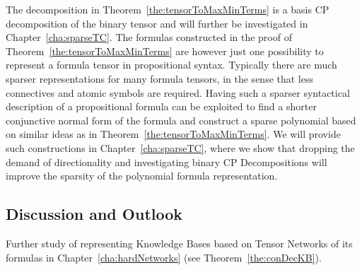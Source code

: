\begin{remark}
	The decomposition in Theorem~\ref{the:tensorToMaxMinTerms} is a basis CP decomposition of the binary tensor and will further be investigated in Chapter~\ref{cha:sparseTC}. 
	The formulas constructed in the proof of Theorem~\ref{the:tensorToMaxMinTerms} are however just one possibility to represent a formula tensor in propositional syntax.
	Typically there are much sparser representations for many formula tensors, in the sense that less connectives and atomic symbols are required.
	Having such a sparser syntactical description of a propositional formula can be exploited to find a shorter conjunctive normal form of the formula and construct a sparse polynomial based on similar ideas as in Theorem~\ref{the:tensorToMaxMinTerms}.
	We will provide such constructions in Chapter~\ref{cha:sparseTC}, where we show that dropping the demand of directionality and investigating binary CP Decompositions will improve the sparsity of the polynomial formula representation.
\end{remark}


\subsection{Discussion and Outlook}

Further study of representing Knowledge Bases based on Tensor Networks of its formulas in Chapter~\ref{cha:hardNetworks} (see Theorem~\ref{the:conDecKB}).




